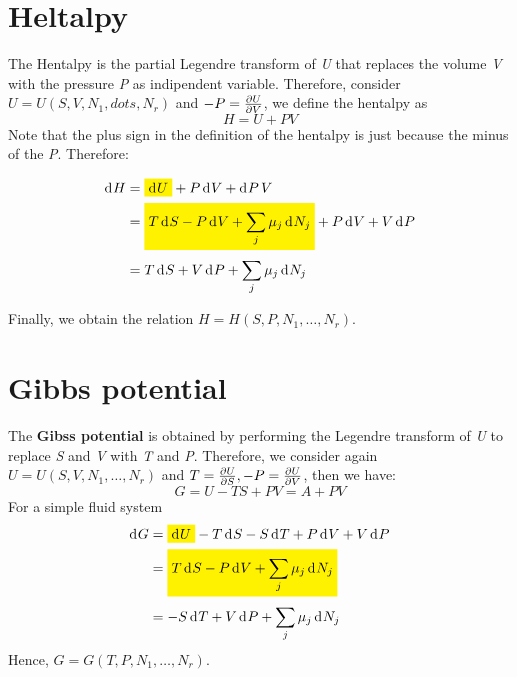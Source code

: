 \documentclass[../main/main.tex]{subfiles}
\begin{document}
\section{Heltalpy}

The Hentalpy is the partial Legendre transform of \emph{U} that replaces the volume \emph{V} with the pressure \emph{P} as indipendent variable. Therefore, consider \( U=U(S,V,N_1,dots,N_r) \) and \( -P = \pdv{U}{V}  \), we define the hentalpy as
\begin{equation}
  H = U + P V
  \label{eq:}
\end{equation}
Note that the plus sign in the definition of the hentalpy is just because the minus of the \emph{P}.
Therefore:

\begin{equation}
  \begin{split}
    \dd[]{H} & = \mathcolorbox{yellow}{\dd[]{U}} + P \dd[]{V} + \dd[]{P} V \\
    & = \mathcolorbox{yellow}{T \dd[]{S} - P \dd[]{V} + \sum_{j}^{} \mu _j \dd[]{N_j}} + P \dd[]{V} + V \dd[]{P} \\
    & = T \dd[]{S} + V \dd[]{P} + \sum_{j}^{} \mu _j \dd[]{N_j}
  \end{split}
\end{equation}

Finally, we obtain the relation \( H = H ( S, P, N_1 , \dots, N_r ) \).

\section{Gibbs potential}
The \textbf{Gibss potential} is obtained by performing the Legendre transform of \emph{U} to replace \emph{S} and \emph{V} with \emph{T} and \emph{P}.
Therefore, we consider again \( U=U(S,V,N_1,\dots,N_r) \) and \( T=\pdv{U}{S}, -P = \pdv{U}{V}  \), then we have:
\begin{equation}
  G = U - T S + P V = A + P V
  \label{eq:}
\end{equation}
For a simple fluid system
\begin{equation}
\begin{split}
\dd[]{G}   &= \mathcolorbox{yellow}{\dd[]{U}} - T \dd[]{S} - S \dd[]{T} + P \dd[]{V} + V \dd[]{P}    \\
& = \mathcolorbox{yellow}{T \dd[]{S} - P \dd[]{V} + \sum_{j}^{} \mu _j \dd[]{N_j}  } \\
& = - S \dd[]{T} + V \dd[]{P} + \sum_{j}^{} \mu _j \dd[]{N_j}
\end{split}
  \label{eq:}
\end{equation}
Hence, \( G = G (T,P,N_1,\dots,N_r) \).
\end{document}
